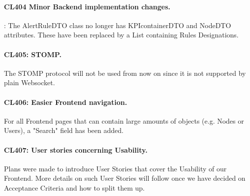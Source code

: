 \documentclass{scrreprt}
\begin{document}
\paragraph{CL404 Minor Backend implementation changes.}: The AlertRuleDTO class no longer has KPIcontainerDTO and NodeDTO attributes. These have been replaced by a List containing Rules Designations.
\paragraph{CL405: STOMP.} The STOMP protocol will not be used from now on since it is not supported by plain Websocket.
\paragraph{CL406: Easier Frontend navigation.} For all Frontend pages that can contain large amounts of objects (e.g. Nodes or Users), a "Search" field has been added.
\paragraph{CL407: User stories concerning Usability.} Plans were made to introduce User Stories that cover the Usability of our Frontend. More details on such User Stories will follow once we have decided on Acceptance Criteria and how to split them up.
\
\end{document}
